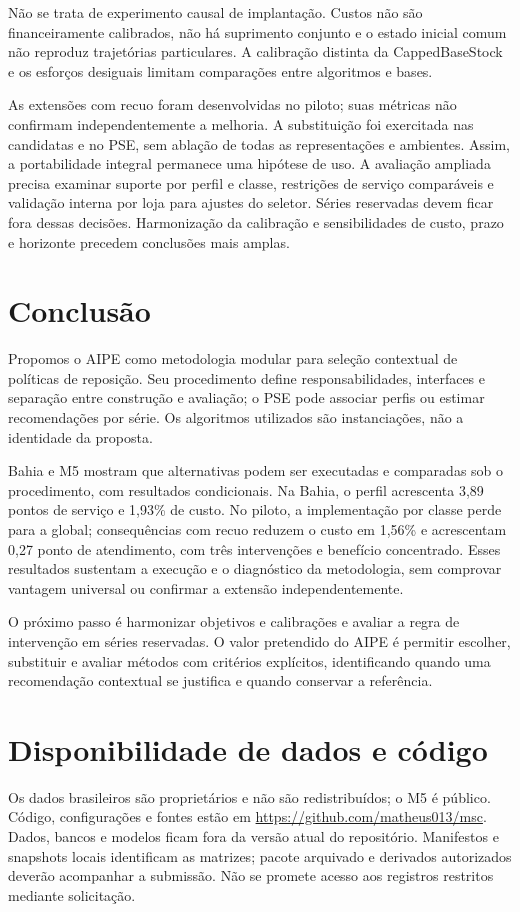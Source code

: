 \documentclass[preprint,12pt]{elsarticle}
\begin{document}
Não se trata de experimento causal de implantação. Custos não são financeiramente calibrados, não há suprimento conjunto e o estado inicial comum não reproduz trajetórias particulares. A calibração distinta da CappedBaseStock e os esforços desiguais limitam comparações entre algoritmos e bases.

As extensões com recuo foram desenvolvidas no piloto; suas métricas não confirmam independentemente a melhoria. A substituição foi exercitada nas candidatas e no PSE, sem ablação de todas as representações e ambientes. Assim, a portabilidade integral permanece uma hipótese de uso. A avaliação ampliada precisa examinar suporte por perfil e classe, restrições de serviço comparáveis e validação interna por loja para ajustes do seletor. Séries reservadas devem ficar fora dessas decisões. Harmonização da calibração e sensibilidades de custo, prazo e horizonte precedem conclusões mais amplas.

\section{Conclusão}
Propomos o AIPE como metodologia modular para seleção contextual de políticas de reposição. Seu procedimento define responsabilidades, interfaces e separação entre construção e avaliação; o PSE pode associar perfis ou estimar recomendações por série. Os algoritmos utilizados são instanciações, não a identidade da proposta.

Bahia e M5 mostram que alternativas podem ser executadas e comparadas sob o procedimento, com resultados condicionais. Na Bahia, o perfil acrescenta 3,89 pontos de serviço e 1,93\% de custo. No piloto, a implementação por classe perde para a global; consequências com recuo reduzem o custo em 1,56\% e acrescentam 0,27 ponto de atendimento, com três intervenções e benefício concentrado. Esses resultados sustentam a execução e o diagnóstico da metodologia, sem comprovar vantagem universal ou confirmar a extensão independentemente.

O próximo passo é harmonizar objetivos e calibrações e avaliar a regra de intervenção em séries reservadas. O valor pretendido do AIPE é permitir escolher, substituir e avaliar métodos com critérios explícitos, identificando quando uma recomendação contextual se justifica e quando conservar a referência.

\section*{Disponibilidade de dados e código}
Os dados brasileiros são proprietários e não são redistribuídos; o M5 é público. Código, configurações e fontes estão em \url{https://github.com/matheus013/msc}. Dados, bancos e modelos ficam fora da versão atual do repositório. Manifestos e snapshots locais identificam as matrizes; pacote arquivado e derivados autorizados deverão acompanhar a submissão. Não se promete acesso aos registros restritos mediante solicitação.
\end{document}
